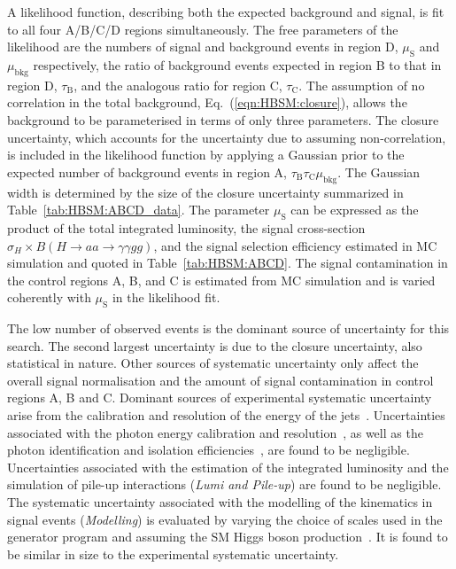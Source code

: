 A likelihood function, describing both the expected background and signal, is fit to all four A/B/C/D regions simultaneously.
The free parameters of the likelihood are the numbers of signal and background events in region D, 
$\mu_\text{S}$ and $\mu_\text{bkg}$ respectively, the ratio of background events expected in region B to that in region D, $\tau_\text{B}$, 
and the analogous ratio for region C, $\tau_\text{C}$.
The assumption of no correlation in the total background, Eq.~(\ref{eqn:HBSM:closure}), 
allows the background to be parameterised in terms of only three parameters.
The closure uncertainty, which accounts for the uncertainty due to assuming non-correlation, is included in the likelihood function by applying a Gaussian prior
to the expected number of background events in region A, $\tau_\text{B}\tau_\text{C}\mu_\text{bkg}$.
The Gaussian width is determined by the size of the closure uncertainty summarized in Table~\ref{tab:HBSM:ABCD_data}.
The parameter $\mu_\text{S}$ can be expressed as the product of the total integrated luminosity, the signal cross-section 
$\sigma_H\times B(H\to aa\to \gamma\gamma gg)$, and the signal selection efficiency estimated in MC simulation
and quoted in Table~\ref{tab:HBSM:ABCD}.
The signal contamination in the control regions A, B, and C is estimated from MC simulation 
and is varied coherently with $\mu_\text{S}$ in the likelihood fit.

The low number of observed events is the dominant source of uncertainty for this search.
The second largest uncertainty is due to the closure uncertainty, also statistical in nature.
Other sources of systematic uncertainty only affect the overall signal normalisation and the amount of signal contamination
in control regions A, B and C.
Dominant sources of experimental systematic uncertainty arise from the calibration and resolution of the energy of the 
jets~\cite{PERF-2016-04,PERF-2011-04}. 
Uncertainties associated with the photon energy calibration and resolution~\cite{PERF-2013-05}, as well as the photon identification and isolation
efficiencies~\cite{PERF-2013-04}, are found to be negligible. Uncertainties associated 
with the estimation of the integrated luminosity and the simulation of pile-up interactions (\textit{Lumi and Pile-up})
are found to be negligible. 
The systematic uncertainty associated with the modelling of the kinematics in signal 
events (\textit{Modelling}) is evaluated by varying the choice of scales used in the generator program and
assuming the SM Higgs boson production~\cite{Heinemeyer:2013tqa}.
It is found to be similar in size to the experimental systematic uncertainty.

